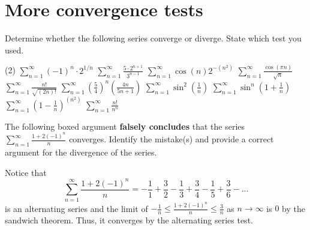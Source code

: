 \documentclass{discussion}
\author{Sections B04 and B06}
\date{Fall 2024}
\begin{document}
\section{More convergence tests}

\begin{question}
    Determine whether the following series converge or diverge.
    State which test you used.
    \begin{tasks}[label={\arabic*.}](2)
        \task \(\displaystyle \sum_{n=1}^\infty (-1)^n \cdot 2^{1/n}\)
        \task \(\displaystyle \sum_{n=1}^\infty \frac{5 \cdot 2^{n+1}}{3^{n-1}}\)
        \task \(\displaystyle \sum_{n=1}^\infty \cos(n) 2^{-(n^2)}\)
        \task \(\displaystyle \sum_{n=1}^\infty \frac{\cos(\pi n)}{\sqrt{n}}\)
        \task \(\displaystyle \sum_{n=1}^\infty \frac{n!}{\sqrt{(2n)!}}\)
        \task \(\displaystyle \sum_{n=1}^\infty \left( \frac{5}{4} \right)^n \left( \frac{4n}{5n + 1} \right)\)
        \task \(\displaystyle \sum_{n=1}^\infty \sin^2\left( \frac{1}{n} \right)\)
        \task \(\displaystyle \sum_{n=1}^\infty \sin^n\left( 1 + \frac{1}{n} \right)\)
        \task \(\displaystyle \sum_{n=1}^\infty \left( 1 - \frac{1}{n} \right)^{(n^2)}\)
        \task \(\displaystyle \sum_{n=1}^\infty \frac{n!}{n^n}\)
    \end{tasks}
\end{question}

\vspace{1em}

\begin{question}
    The following boxed argument \textbf{falsely concludes} that the series \(\displaystyle \sum_{n=1}^\infty \frac{1 + 2(-1)^n}{n}\) converges.
    Identify the mistake(s) and provide a correct argument for the divergence of the series.
    \begin{mdframed}
        Notice that
        \begin{equation*}
            \sum_{n=1}^\infty \frac{1 + 2(-1)^n}{n} = -\frac{1}{1} + \frac{3}{2} - \frac{1}{3} + \frac{3}{4} - \frac{1}{5} + \frac{3}{6} - \dots
        \end{equation*}
        is an alternating series and the limit of \(-\frac{1}{n} \leq \frac{1 + 2(-1)^n}{n} \leq \frac{3}{n}\) as \(n \to \infty\) is \(0\) by the sandwich theorem.
        Thus, it converges by the alternating series test.
    \end{mdframed}
\end{question}
\end{document}
